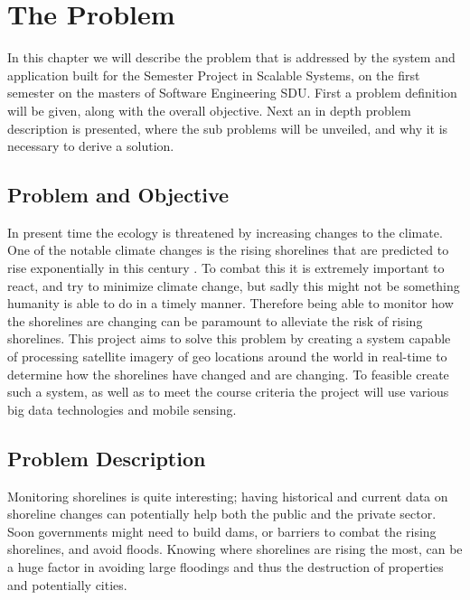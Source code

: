 \chapter{The Problem}

In this chapter we will describe the problem that is addressed by the system and application built for the Semester Project in Scalable Systems, on the first semester on the masters of Software Engineering SDU. \medbreak
\noindent
First a problem definition will be given, along with the overall objective. Next an in depth problem description is presented, where the sub problems will be unveiled, and why it is necessary to derive a solution.

\section{Problem and Objective}

In present time the ecology is threatened by increasing changes to the climate. One of the notable climate changes is the rising shorelines that are predicted to rise exponentially in this century . To combat this it is extremely important to react, and try to minimize climate change, but sadly this might not be something humanity is able to do in a timely manner. Therefore being able to monitor how the shorelines are changing can be paramount to alleviate the risk of rising shorelines. \medbreak 
\noindent
This project aims to solve this problem by creating a system capable of processing satellite imagery of geo locations around the world in real-time to determine how the shorelines have changed and are changing. \medbreak 
\noindent
To feasible create such a system, as well as to meet the course criteria the project will use various big data technologies and mobile sensing.

\section{Problem Description} 

Monitoring shorelines is quite interesting; having historical and current data on shoreline changes can potentially help both the public and the private sector.  \medbreak 
\noindent
Soon governments might need to build dams, or barriers to combat the rising shorelines, and avoid floods. Knowing where shorelines are rising the most, can be a huge factor in avoiding large floodings and thus the destruction of properties and potentially cities.


